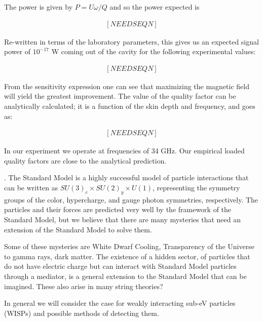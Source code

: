 \documentclass[12pt, twoside]{book}
\begin{document}
The power is given by $P = U\omega/Q$ and so the power expected is

\begin{eqnarray}

[NEEDSEQN]

\end{eqnarray}

Re-written in terms of the laboratory parameters, this gives us an expected signal power of $10^{-17}$ W coming out of the cavity for the following experimental values:

\begin{eqnarray}

[NEEDSEQN]

\end{eqnarray}

From the sensitivity expression one can see that maximizing the magnetic field will yield the greatest improvement. The value of the quality factor can be analytically calculated; it is a function of the skin depth and frequency, and goes as:

\begin{eqnarray}

[NEEDSEQN]

\end{eqnarray}

In our experiment we operate at frequencies of 34 GHz. Our empirical loaded quality factors are close to the analytical prediction.




.
The Standard Model is a highly successful model of particle interactions that can be written as $SU(3)_c \times SU(2)_y \times U(1)$, representing the symmetry groups of the color, hypercharge, and gauge photon symmetries, respectively. The particles and their forces are predicted very well by the framework of the Standard Model, but we believe that there are many mysteries that need an extension of the Standard Model to solve them.

Some of these mysteries are White Dwarf Cooling, Transparency of the Universe to gamma rays, dark matter. The existence of a hidden sector, of particles that do not have electric charge but can interact with Standard Model particles through a mediator, is a general extension to the Standard Model that can be imagined. These also arise in many string theories?

In general we will consider the case for weakly interacting sub-eV particles (WISPs) and possible methods of detecting them.
\end{document}
